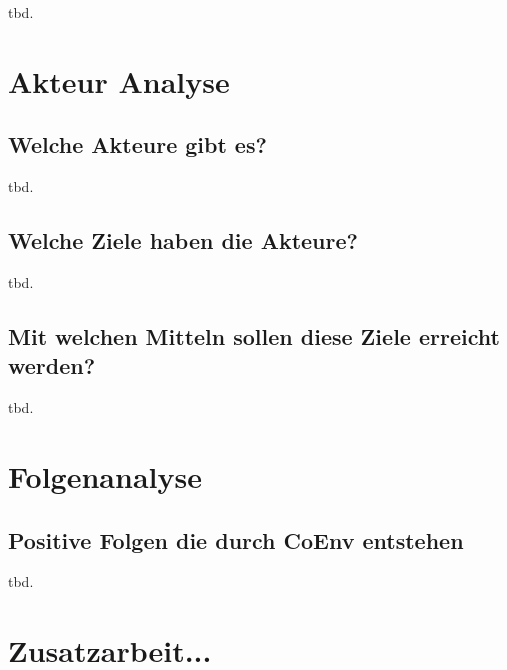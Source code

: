 \documentclass{article}
\begin{document}
tbd.

\section{Akteur Analyse}

\subsection{Welche Akteure gibt es?}

tbd.

\subsection{Welche Ziele haben die Akteure?}

tbd.

\subsection{Mit welchen Mitteln sollen diese Ziele erreicht werden?}

tbd.

\section{Folgenanalyse}

\subsection{Positive Folgen die durch CoEnv entstehen}

tbd.

\section{Zusatzarbeit...}
\end{document}
